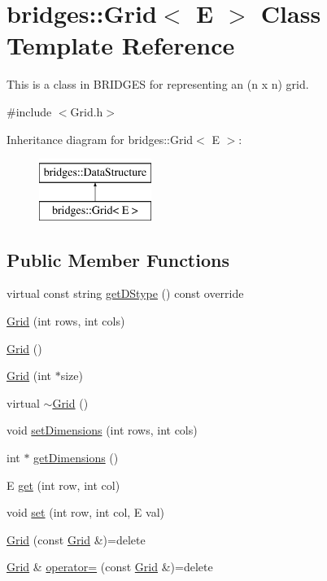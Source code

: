 \hypertarget{classbridges_1_1_grid}{}\section{bridges\+:\+:Grid$<$ E $>$ Class Template Reference}
\label{classbridges_1_1_grid}


This is a class in B\+R\+I\+D\+G\+E\+S for representing an (n x n) grid.  




{\ttfamily \#include $<$Grid.\+h$>$}

Inheritance diagram for bridges\+:\+:Grid$<$ E $>$\+:\begin{figure}[H]
\begin{center}
\leavevmode
\includegraphics[height=2.000000cm]{classbridges_1_1_grid}
\end{center}
\end{figure}
\subsection*{Public Member Functions}
\begin{DoxyCompactItemize}
\item 
virtual const string \hyperlink{classbridges_1_1_grid_a02561695978011f50894938b78969913}{get\+D\+Stype} () const  override
\item 
\hyperlink{classbridges_1_1_grid_af8bb9244c4c713f2325af6d4754ad1e9}{Grid} (int rows, int cols)
\item 
\hyperlink{classbridges_1_1_grid_a711e05a933c2a11c9e2775c74e6cf80d}{Grid} ()
\item 
\hyperlink{classbridges_1_1_grid_ad5c6c5e87eb40446ac794c5479937f87}{Grid} (int $\ast$size)
\item 
virtual \hyperlink{classbridges_1_1_grid_a46cc94397ea38211349b10e3629b2590}{$\sim$\+Grid} ()
\item 
void \hyperlink{classbridges_1_1_grid_a8e5e4d92097f9d1481a14219eb5cc5a8}{set\+Dimensions} (int rows, int cols)
\item 
int $\ast$ \hyperlink{classbridges_1_1_grid_ad21e4fc94483ef822fda9b74a52b9f48}{get\+Dimensions} ()
\item 
E \hyperlink{classbridges_1_1_grid_aab69e77d9e1a51eabcf29c9c229cd35f}{get} (int row, int col)
\item 
void \hyperlink{classbridges_1_1_grid_acd750e5886349488257aba85f0b06f6f}{set} (int row, int col, E val)
\item 
\hyperlink{classbridges_1_1_grid_af3b18d3a6b302c200154e869337cc85b}{Grid} (const \hyperlink{classbridges_1_1_grid}{Grid} \&)=delete
\item 
\hyperlink{classbridges_1_1_grid}{Grid} \& \hyperlink{classbridges_1_1_grid_ab79fc10a9ebd55dd3565ca1ea6933b13}{operator=} (const \hyperlink{classbridges_1_1_grid}{Grid} \&)=delete
\end{DoxyCompactItemize}
